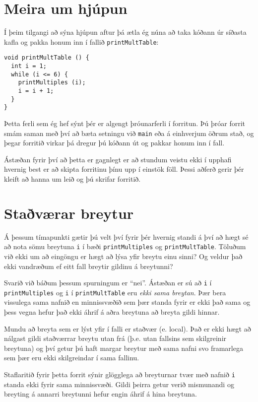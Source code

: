 \section{Meira um hjúpun}

Í þeim tilgangi að sýna hjúpun aftur þá ætla ég núna að taka kóðann úr síðasta kafla og pakka honum inn í fallið {\tt printMultTable}:

\begin{verbatim}
void printMultTable () {
  int i = 1;
  while (i <= 6) {
    printMultiples (i);
    i = i + 1;
  }
}
\end{verbatim}
%
Þetta ferli sem ég hef sýnt þér er algengt þróunarferli í forritun.
Þú þróar forrit smám saman með því að bæta setningu við {\tt main} eða á einhverjum öðrum stað, 
og þegar forritið virkar þá dregur þú kóðann út og pakkar honum inn í fall.

Ástæðan fyrir því að þetta er gagnlegt er að stundum veistu ekki í upphafi hvernig best er að skipta forritinu þínu upp í einstök föll.
Þessi aðferð gerir þér kleift að hanna um leið og þú skrifar forritið.

\section{Staðværar breytur}

Á þessum tímapunkti gætir þú velt því fyrir þér hvernig standi á því að hægt sé að nota sömu breytuna {\tt i}
í bæði {\tt printMultiples} og {\tt printMultTable}.
Töluðum við ekki um að eingöngu er hægt að lýsa yfir breytu einu sinni?
Og veldur það ekki vandræðum ef eitt fall breytir gildinu á breytunni?

Svarið við báðum þessum spurningum er ``nei''.
Ástæðan er sú að {\tt i} í {\tt printMultiples} og {\tt i} í {\tt printMultTable} eru {\em ekki sama breytan}.
Þær bera vissulega sama nafnið en minnissvæðið sem þær standa fyrir er ekki það sama og þess vegna hefur það ekki áhrif á aðra breytuna að breyta gildi hinnar.


Mundu að breyta sem er lýst yfir í falli er staðvær (e. local).
Það er ekki hægt að nálgast gildi staðværrar breytu utan frá (þ.e. utan fallsins sem skilgreinir breytuna)
og því getur þú haft margar breytur með sama nafni svo framarlega sem þær eru ekki skilgreindar í sama fallinu.

Staflaritið fyrir þetta forrit sýnir glögglega að breyturnar tvær með nafnið {\tt i} standa ekki fyrir sama minnissvæði.
Gildi þeirra getur verið mismunandi og breyting á annarri breytunni hefur engin áhrif á hina breytuna.

